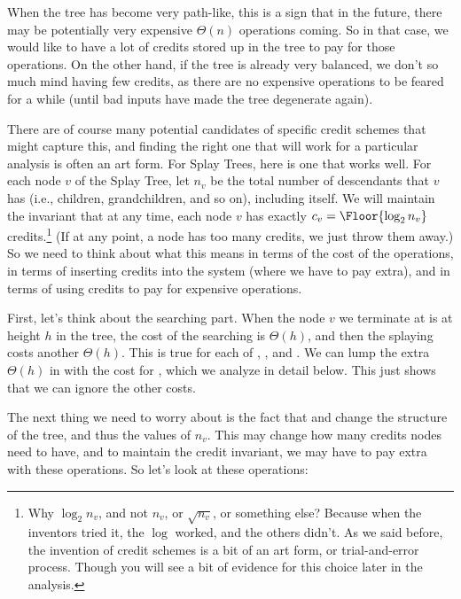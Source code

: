 When the tree has become very path-like, this is a sign that in the
future, there may be potentially very expensive $\Theta(n)$ operations
coming. So in that case, we would like to have a lot of credits stored
up in the tree to pay for those operations. On the other hand, if the
tree is already very balanced, we don't so much mind having few
credits, as there are no expensive operations to be feared for a while
(until bad inputs have made the tree degenerate again).

There are of course many potential candidates of specific credit
schemes that might capture this, and finding the right one that will
work for a particular analysis is often an art form. 
For Splay Trees, here is one that works well.
For each node $v$ of the Splay Tree, let $n_v$ be the total number of
descendants that $v$ has (i.e., children, grandchildren, and so on),
including itself. We will maintain the invariant that at any time,
each node $v$ has exactly $c_v = \Floor{\log_2 n_v}$ credits.\footnote{Why
  $\log_2 n_v$, and not $n_v$, or $\sqrt{n_v}$, or something else?
  Because when the inventors tried it, the $\log$ worked, and the
  others didn't. As we said before, the invention of credit schemes is
  a bit of an art form, or trial-and-error process. Though you will
  see a bit of evidence for this choice later in the analysis.}
(If at any point, a node has too many credits, we just throw them away.)
So we need to think about what this means in terms of the cost of the
operations, in terms of inserting credits into the system (where we
have to pay extra), and in terms of using credits to pay for expensive
operations.

First, let's think about the searching part. When the node $v$ we
terminate at is at height $h$ in the tree, the cost of the searching
is $\Theta(h)$, and then the splaying costs another $\Theta(h)$. 
This is true for each of , , and .
We can lump the extra $\Theta(h)$ in with the cost for ,
which we analyze in detail below. This just shows that we can ignore
the other costs.

The next thing we need to worry about is the fact that  and
 change the structure of the tree, and thus the values of
$n_v$. This may change how many credits nodes need to have, and to
maintain the credit invariant, we may have to pay extra with these
operations. So let's look at these operations:

